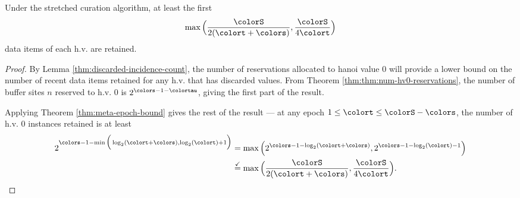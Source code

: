\begin{lemma}
\label{thm:stretched-reservation-count}
Under the stretched curation algorithm, at least the first
\begin{align*}
\max\Big(
  \frac{\colorS}{2(\colort + \colors)},
  \frac{\colorS}{4\colort}
\Big)
\end{align*}
data items of each h.v. are retained.
\end{lemma}
\begin{proof}

By Lemma \ref{thm:discarded-incidence-count}, the number of reservations allocated to hanoi value 0 will provide a lower bound on the number of recent data items retained for any h.v. that has discarded values.
From Theorem \ref{thm:thm:num-hv0-reservations}, the number of buffer sites $n$ reserved to h.v. 0 is $2^{\colors-1-\colortau}$, giving the first part of the result.

Applying Theorem \ref{thm:meta-epoch-bound} gives the rest of the result --- at any epoch $1 \leq \colort \leq \colorS - \colors$, the number of h.v. 0 instances retained is at least
\begin{align*}
2^{\colors - 1 - \min\Big(
  \log_2(\colort + \colors),
  \log_2(\colort) + 1
\Big)}
&= \max\Big(
  2^{\colors - 1 - \log_2(\colort + \colors)},
  2^{\colors - 1 - \log_2(\colort) - 1}
\Big)\\
&\stackrel{\checkmark}{=} \max\Big(
  \frac{\colorS}{2(\colort + \colors)},
  \frac{\colorS}{4\colort}
\Big).
\end{align*}

\end{proof}
